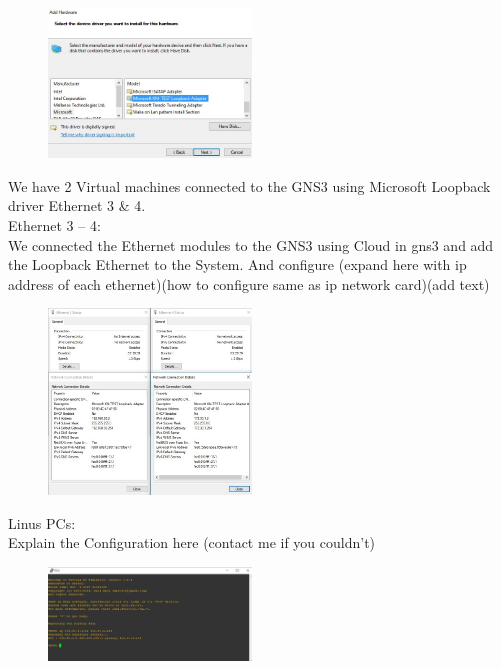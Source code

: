 \documentclass{article}
\begin{document}
\begin{figure}[H]
	\begin{center}
		\includegraphics[width=0.48\textwidth]{LoopBackIns2.jpg}
	\end{center}
	\caption{\small  \newline}
	\label{fig:Prd}
\end{figure}


We have 2 Virtual machines connected to the GNS3 using Microsoft Loopback driver Ethernet 3 \& 4.\\


Ethernet 3 – 4:\\
We connected the Ethernet modules to the GNS3 using Cloud in gns3 and add the Loopback Ethernet to the System. And configure (expand here with ip address of each ethernet)(how to configure same as ip network card)(add text)

\begin{figure}[H]
	\begin{center}
		\includegraphics[width=0.48\textwidth]{Ethernet.jpg}
	\end{center}
	\caption{\small  \newline}
	\label{fig:Prd}
\end{figure}


Linus PCs:\\
Explain the Configuration here (contact me if you couldn’t)

\begin{figure}[H]
	\begin{center}
		\includegraphics[width=0.48\textwidth]{VPC.jpg}
	\end{center}
	\caption{\small  \newline}
	\label{fig:Prd}
\end{figure}
\end{document}
